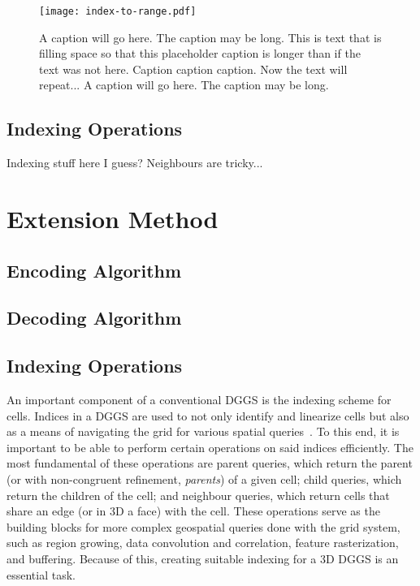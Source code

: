 \begin{figure}[htp!]
	\centering
	\texttt{[image: index-to-range.pdf]}
	\caption[Runtime comparison of SDOG decoding algorithms]{
		A caption will go here.
		The caption may be long.
		This is text that is filling space so that this placeholder caption is longer than if the text was not here.
		Caption caption caption.
		Now the text will repeat...
		A caption will go here.
		The caption may be long.
	}
	\label{fig:index-to-range}
\end{figure}


\subsection{Indexing Operations}

Indexing stuff here I guess?
Neighbours are tricky...


\section{Extension Method}

\subsection{Encoding Algorithm}

\subsection{Decoding Algorithm}

\subsection{Indexing Operations}
An important component of a conventional DGGS is the indexing scheme for cells.
Indices in a DGGS are used to not only identify and linearize cells but also as a means of navigating the grid for various spatial queries~\cite{alderson2020digital}.
To this end, it is important to be able to perform certain operations on said indices efficiently.
The most fundamental of these operations are parent queries, which return the parent (or with non-congruent refinement, \textit{parents}) of a given cell; child queries, which return the children of the cell; and neighbour queries, which return cells that share an edge (or in 3D a face) with the cell.
These operations serve as the building blocks for more complex geospatial queries done with the grid system, such as region growing, data convolution and correlation, feature rasterization, and buffering.
Because of this, creating suitable indexing for a 3D DGGS is an essential task.


